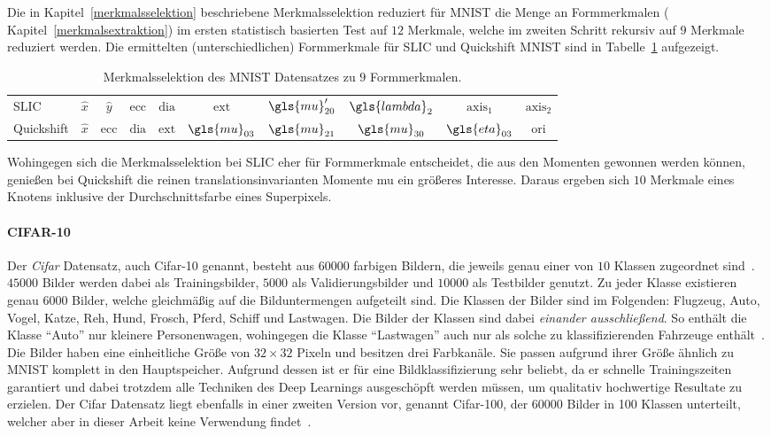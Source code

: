 Die in Kapitel~\ref{merkmalsselektion} beschriebene Merkmalsselektion reduziert für \gls{MNIST} die Menge an Formmerkmalen (\vgl{} Kapitel~\ref{merkmalsextraktion}) im ersten statistisch basierten Test auf $12$ Merkmale, welche im zweiten Schritt rekursiv auf $9$ Merkmale reduziert werden.
Die ermittelten (unterschiedlichen) Formmerkmale für \gls{SLIC} und Quickshift \bzgl{} \gls{MNIST} sind in Tabelle~\ref{tab:mnist_merkmale} aufgezeigt.
\begin{table}[t]
\centering
\begin{tabular}{lccccccccc}
  \toprule
  \gls{SLIC} & $\hat{x}$ & $\hat{y}$ & $\mathrm{ecc}$ & $\mathrm{dia}$ & $\mathrm{ext}$ & $\gls{mu}^{\prime}_{20}$ & $\gls{lambda}_2$ & $\mathrm{axis}_1$ & $\mathrm{axis}_2$\\
  Quickshift & $\hat{x}$ & $\mathrm{ecc}$ & $\mathrm{dia}$ & $\mathrm{ext}$ & $\gls{mu}_{03}$ & $\gls{mu}_{21}$ & $\gls{mu}_{30}$ & $\gls{eta}_{03}$ & $\mathrm{ori}$\\
  \bottomrule
\end{tabular}
  \caption[\gls{MNIST} Merkmalsselektion]{Merkmalsselektion des \gls{MNIST} Datensatzes zu $9$ Formmerkmalen.}
\label{tab:mnist_merkmale}
\end{table}
Wohingegen sich die Merkmalsselektion bei \gls{SLIC} eher für Formmerkmale entscheidet, die aus den Momenten gewonnen werden können, genießen bei Quickshift die reinen translationsinvarianten Momente \gls{mu} ein größeres Interesse.
Daraus ergeben sich $10$ Merkmale eines Knotens inklusive der Durchschnittsfarbe eines Superpixels.

\paragraph{CIFAR-10}
\label{cifar_10}

Der \emph{\gls{Cifar}} Datensatz, auch \gls{Cifar}-10 genannt, besteht aus $60000$ farbigen Bildern, die jeweils genau einer von $10$ Klassen zugeordnet sind~\cite{cifar_10}.
$45000$ Bilder werden dabei als Trainingsbilder, $5000$ als Validierungsbilder und $10000$ als Testbilder genutzt.
Zu jeder Klasse existieren genau $6000$ Bilder, welche gleichmäßig auf die Bilduntermengen aufgeteilt sind.
Die Klassen der Bilder sind im Folgenden: Flugzeug, Auto, Vogel, Katze, Reh, Hund, Frosch, Pferd, Schiff und Lastwagen.
Die Bilder der Klassen sind dabei \emph{einander ausschließend}.
So enthält die Klasse \enquote{Auto} nur kleinere Personenwagen, wohingegen die Klasse \enquote{Lastwagen} auch nur als solche zu klassifizierenden Fahrzeuge enthält~\cite{cifar_10}.
Die Bilder haben eine einheitliche Größe von $32 \times 32$ Pixeln und besitzen drei Farbkanäle.
Sie passen aufgrund ihrer Größe ähnlich zu \gls{MNIST} komplett in den Hauptspeicher.
Aufgrund dessen ist er für eine Bildklassifizierung sehr beliebt, da er schnelle Trainingszeiten garantiert und dabei trotzdem alle Techniken des Deep Learnings ausgeschöpft werden müssen, um qualitativ hochwertige Resultate zu erzielen.
Der \gls{Cifar} Datensatz liegt ebenfalls in einer zweiten Version vor, genannt \gls{Cifar}-100, der 60000 Bilder in 100 Klassen unterteilt, welcher aber in dieser Arbeit keine Verwendung findet~\cite{cifar_10}.

